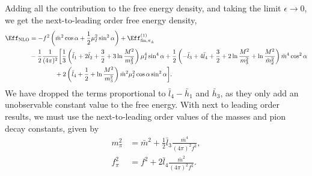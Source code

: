 Adding all the contribution to the free energy density, and taking the limit $\epsilon \rightarrow 0$, we get the next-to-leading order free energy density,
%
\begin{align}
    \nonumber
    \Eff_{\mathrm{NLO}} &=
    - f^2 \left(\bar m^2 \cos \alpha + \frac{1}{2}\mu_I^2 \sin^2 \alpha\right)
    + \Eff^{(1)}_{\mathrm{fin}, \pi_\pm} \\ \nonumber
    & - \frac{1}{2}\frac{1}{(4 \pi)^2}
    \bigg[
        \frac{1}{3}
        \left( 
            \bar l_1 + 2 \bar l_2 + \frac{3}{2} + 3 \ln \frac{M^2}{m_3^2}
        \right) \mu_I^4 \sin^4 \alpha
        +
        \frac{1}{2}
        \left(
            - \bar l_3 + 4 \bar l_4 + \frac{3}{2} + 2\ln \frac{M^2}{m_3^2}
            + \ln \frac{M^2}{\tilde m^2_2}
        \right) \bar m^4 \cos^2\alpha \\
        & \quad \quad \quad \quad 
        + 2 \left(\bar l_4 + \frac{1}{2} + \ln \frac{M^2}{m_3^2}\right)
        \bar m^2 \mu_I^2 \cos\alpha \sin^2 \alpha
        \label{NLO free energy}
    \bigg].
\end{align}
%
We have dropped the terms proportional to $\bar l_4 - \bar h_1$ and $\bar h_3$, as they only add an unobservable constant value to the free energy.
With next to leading order results, we must use the next-to-leading order values of the masses and pion decay constants, given by~\autocite{gasserChiralPerturbationTheory1984}
%
\begin{align}
    \label{equation bare mass}
    m_\pi^2 & = \bar m^2 + \frac{1}{2}\bar l_3 \frac{\bar m^4}{(4\pi)^2 f^2}, \\
    \label{equation bare decay constant}
    f_\pi^2 & = f^2 + 2\bar l_4\frac{\bar m^2}{(4\pi)^2f^2}.
\end{align}
%


